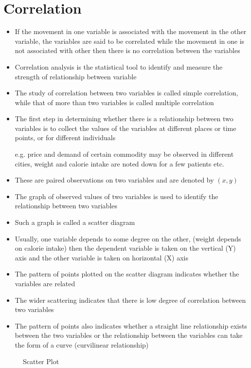 \documentclass[
10pt, %
a4paper, %
]{report}
\begin{document}
\section*{Correlation}
\begin{itemize}
\item If the movement in one variable is associated with the movement in the other variable, the variables are said to be correlated while the movement in one is not associated with other then there is no correlation between the variables
\item Correlation analysis is the statistical tool to identify and measure the strength of relationship between variable
\item The study of correlation between two variables is called simple correlation, while that of more than two variables is called multiple correlation
\item The first step in determining whether there is a relationship between two variables is to collect the values of the variables at different places or time points, or for different individuals
\item[e.g.] price and demand of certain commodity may be observed in different cities, weight and calorie intake are noted down for a few patients etc.
\item These are paired observations on two variables and are denoted by \((x, y)\)
\item The graph of observed values of two variables is used to identify the relationship between two variables
\item Such a graph is called a scatter diagram
\item Usually, one variable depends to some degree on the other, (weight depends on calorie intake) then the dependent variable is taken on the vertical (Y) axis and the other variable is taken on horizontal (X) axis
\item The pattern of points plotted on the scatter diagram indicates whether the variables are related
\item The wider scattering indicates that there is low degree of correlation between two variables
\item The pattern of points also indicates whether a straight line relationship exists between the two variables or the relationship between the variables can take the form of a curve (curvilinear relationship)
\end{itemize}

\begin{figure}[h!]
\begin{center}
\end{center}
\caption{Scatter Plot}
\label{fig:scatter}
\end{figure}
\end{document}
